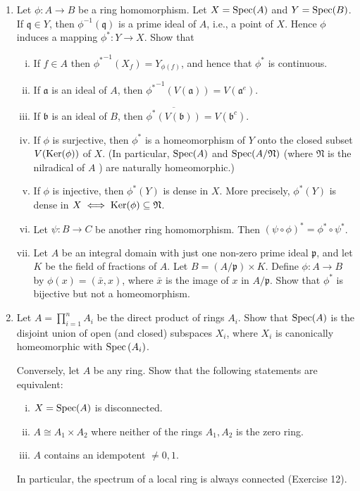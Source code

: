\documentclass[class=book, crop=false]{standalone}
\theoremstyle{definition}
\theoremstyle{remark}
\begin{document}
\begin{enumerate}[resume*=exc1]
  \item Let $\phi: A \to B$ be a ring homomorphism. Let
        $X=\operatorname{Spec}(A)$ and $Y=\operatorname{Spec}(B)$. If
        $\mathfrak{q} \in Y$, then $\phi^{-1}(\mathfrak{q})$ is a prime ideal of $A$,
        i.e., a point of $X$. Hence $\phi$ induces a mapping
        $\phi^{*}: Y \to X$. Show that
\begin{enumerate}[i)]
  \item If $f \in A$ then ${\phi^{*}}^{-1}\left(X_{f}\right)=Y_{\phi(f)}$, and hence that
$\phi^{*}$ is continuous.
  \item If $\mathfrak{a}$ is an ideal of $A$, then
${\phi^{*}}^{-1}(V(\mathfrak{a}))=V\left(\mathfrak{a}^{e}\right)$.
  \item If $\mathfrak{b}$ is an ideal of $B$, then
$\overline{\phi^{*}(V(\mathfrak{b}))}=V\left(\mathfrak{b}^{c}\right)$.
  \item If $\phi$ is surjective, then $\phi^{*}$ is a homeomorphism of $Y$ onto the
closed subset $V(\operatorname{Ker}(\phi))$ of $X$. (In particular,
$\operatorname{Spec}(A)$ and $\operatorname{Spec}(A / \mathfrak{N})$ (where $\mathfrak{N}$ is the
nilradical of $A$ ) are naturally homeomorphic.)
  \item If $\phi$ is injective, then $\phi^{*}(Y)$ is dense in $X$. More precisely,
$\phi^{*}(Y)$ is dense in
$X \iff \operatorname{Ker}(\phi) \subseteq \mathfrak{N}$.
  \item Let $\psi: B \to C$ be another ring homomorphism. Then
$(\psi \circ \phi)^{*}=\phi^{*} \circ \psi^{*}$.
  \item Let $A$ be an integral domain with just one non-zero prime ideal
$\mathfrak{p}$, and let $K$ be the field of fractions of $A$. Let
$B=(A / \mathfrak{p}) \times K$. Define $\phi: A \to B$ by
$\phi(x)=(\bar{x}, x)$, where $\bar{x}$ is the image of $x$ in
$A / \mathfrak{p}$. Show that $\phi^{*}$ is bijective but not a homeomorphism.
\end{enumerate}

  \item Let $A=\prod_{i=1}^{n} A_{i}$ be the direct product of rings $A_{i}$.
        Show that $\operatorname{Spec}(A)$ is the disjoint union of open (and
        closed) subspaces $X_{i}$, where $X_{i}$ is canonically homeomorphic
        with $\operatorname{Spec}\left(A_{i}\right)$.

        Conversely, let $A$ be any
        ring. Show that the following statements are equivalent:
        \begin{enumerate}[i)]
          \item $X=\operatorname{Spec}(A)$ is disconnected.
          \item $A \cong A_{1} \times A_{2}$ where neither of the rings $A_{1}, A_{2}$ is
the zero ring.
          \item $A$ contains an idempotent $\neq 0,1$.
        \end{enumerate}
In particular, the spectrum of a local ring is always connected (Exercise 12).


\end{enumerate}
\end{document}
